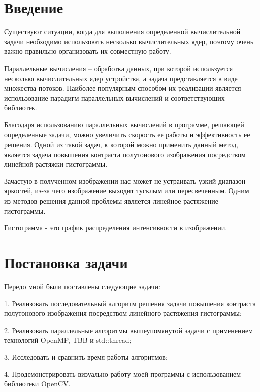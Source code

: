\documentclass{report}
\begin{document}
\setcounter{page}{2}

\tableofcontents
\newpage

\section*{Введение}
\par Существуют ситуации, когда для выполнения определенной вычислительной задачи необходимо использовать несколько вычислительных ядер, поэтому очень важно правильно организовать их совместную работу. 
\par Параллельные вычисления – обработка данных, при которой используется несколько вычислительных ядер устройства, а задача представляется в виде множества потоков. Наиболее популярным способом их реализации является использование парадигм параллельных вычислений и соответствующих библиотек. 
\par Благодаря использованию параллельных вычислений в программе, решающей определенные задачи, можно увеличить скорость ее работы и эффективность ее решения. Одной из такой задач, к которой можно применить данный метод, является задача повышения контраста полутонового изображения посредством линейной растяжки гистограммы. 
\par Зачастую в полученном изображении нас может не устраивать узкий диапазон яркостей, из-за чего изображение выходит тусклым или пересвеченным. Одним из методов решения данной проблемы является линейное растяжение гистограммы.
\par Гистограмма - это график распределения интенсивности в изображении.
\newpage

\section*{Постановка задачи}
\par Передо мной были поставлены следующие задачи: 
\par 1. Реализовать последовательный алгоритм решения задачи повышения контраста полутонового изображения посредством линейного растяжения гистограммы; 
\par 2. Реализовать параллельные алгоритмы вышеупомянутой задачи с применением технологий OpenMP, TBB и std::thread; 
\par 3. Исследовать и сравнить время работы алгоритмов; 
\par 4. Продемонстрировать визуально работу моей программы с использованием библиотеки OpenCV.
\newpage
\end{document}
